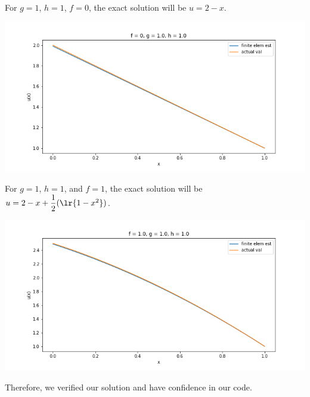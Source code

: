 \begin{solution}
For $g = 1$, $h = 1$, $f = 0$, the exact solution will be $u = 2 - x$.

\begin{center}
    \includegraphics[scale=0.5]{DavidPineiro/f0_g1_h1.png}
\end{center}

For $g = 1$, $h = 1$, and $f = 1$, the exact solution will be $u = 2 - x + \dfrac{1}{2}(\lr{1 - x^{2}})$.

\begin{center}
    \includegraphics[scale=0.5]{DavidPineiro/f1_g1_h1.png}
\end{center}

Therefore, we verified our solution and have confidence in our code.

\end{solution}